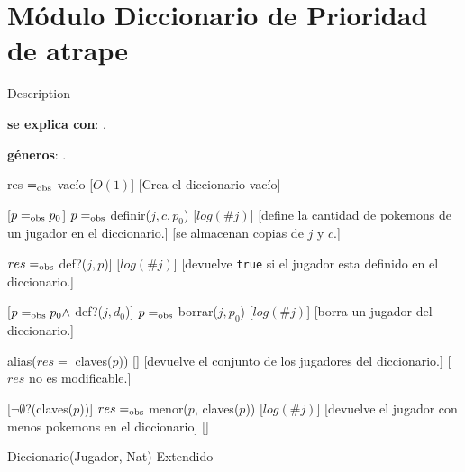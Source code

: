 \section{Módulo Diccionario de Prioridad de atrape}
	Description %

\begin{Interfaz}
	\textbf{se explica con}: . 

	\textbf{géneros}: .


	{res $=_{\mathrm{obs}}$ vacío}
	[$O(1)$]
	[Crea el diccionario vacío]

	[$p =_{\mathrm{obs}} p_0$]
	{$p =_{\mathrm{obs}}$ definir($j, c, p_0$)}
	[$log(\#j)$]
	[define la cantidad de pokemons de un jugador en el diccionario.]
	[se almacenan copias de $j$ y $c$.]

	{$res =_{\mathrm{obs}}$ def?($j, p$)]}
	[$log(\#j)$]
	[devuelve \texttt{true} si el jugador esta definido en el diccionario.]

	[$p =_{\mathrm{obs}} p_0 \land$ def?($j, d_0$)]
	{$p =_{\mathrm{obs}}$ borrar($j, p_0$)}
	[$log(\#j)$]
	[borra un jugador del diccionario.]

	{alias($res =$ claves($p$))}
	[]%
	[devuelve el conjunto de los jugadores del diccionario.]
	[$res$ no es modificable.]

	[$\neg\emptyset$?(claves($p$))]
	{$res =_{\mathrm{obs}}$ menor($p$, claves($p$))}
	[$log(\#j)$]
	[devuelve el jugador con menos pokemons en el diccionario]
	[]


  \begin{tad}{Diccionario(Jugador, Nat) Extendido}
    \parskip=0pt
    
    \tadAxiomas
  \end{tad}

\end{Interfaz}


